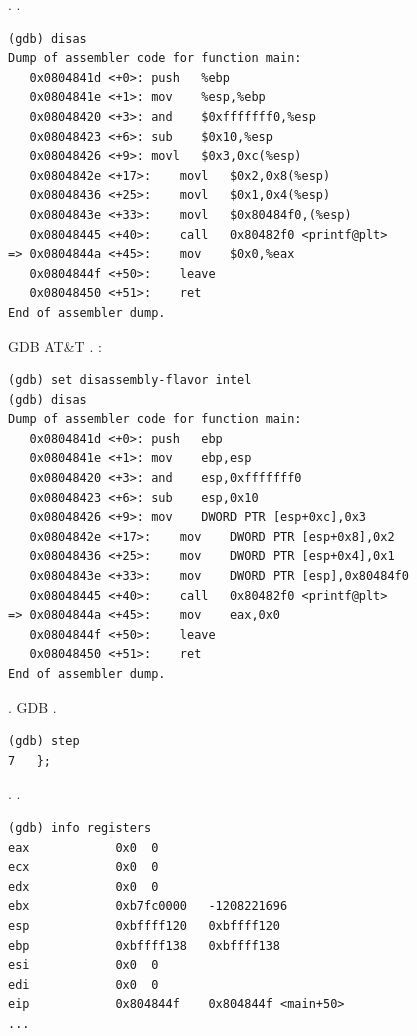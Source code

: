 .
.

\begin{lstlisting}
(gdb) disas
Dump of assembler code for function main:
   0x0804841d <+0>:	push   %ebp
   0x0804841e <+1>:	mov    %esp,%ebp
   0x08048420 <+3>:	and    $0xfffffff0,%esp
   0x08048423 <+6>:	sub    $0x10,%esp
   0x08048426 <+9>:	movl   $0x3,0xc(%esp)
   0x0804842e <+17>:	movl   $0x2,0x8(%esp)
   0x08048436 <+25>:	movl   $0x1,0x4(%esp)
   0x0804843e <+33>:	movl   $0x80484f0,(%esp)
   0x08048445 <+40>:	call   0x80482f0 <printf@plt>
=> 0x0804844a <+45>:	mov    $0x0,%eax
   0x0804844f <+50>:	leave  
   0x08048450 <+51>:	ret    
End of assembler dump.
\end{lstlisting}

\ac{GDB}  AT\&T 
.
:

\begin{lstlisting}
(gdb) set disassembly-flavor intel
(gdb) disas
Dump of assembler code for function main:
   0x0804841d <+0>:	push   ebp
   0x0804841e <+1>:	mov    ebp,esp
   0x08048420 <+3>:	and    esp,0xfffffff0
   0x08048423 <+6>:	sub    esp,0x10
   0x08048426 <+9>:	mov    DWORD PTR [esp+0xc],0x3
   0x0804842e <+17>:	mov    DWORD PTR [esp+0x8],0x2
   0x08048436 <+25>:	mov    DWORD PTR [esp+0x4],0x1
   0x0804843e <+33>:	mov    DWORD PTR [esp],0x80484f0
   0x08048445 <+40>:	call   0x80482f0 <printf@plt>
=> 0x0804844a <+45>:	mov    eax,0x0
   0x0804844f <+50>:	leave  
   0x08048450 <+51>:	ret    
End of assembler dump.
\end{lstlisting}

.
\ac{GDB} .

\begin{lstlisting}
(gdb) step
7	};
\end{lstlisting}

.
\EAX {}.

\begin{lstlisting}
(gdb) info registers
eax            0x0	0
ecx            0x0	0
edx            0x0	0
ebx            0xb7fc0000	-1208221696
esp            0xbffff120	0xbffff120
ebp            0xbffff138	0xbffff138
esi            0x0	0
edi            0x0	0
eip            0x804844f	0x804844f <main+50>
...
\end{lstlisting}
